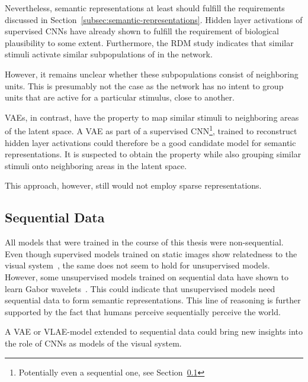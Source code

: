Nevertheless, semantic representations at least should fulfill the requirements discussed in Section~\ref{subsec:semantic-representations}.
Hidden layer activations of supervised \acp{CNN} have already shown to fulfill the requirement of biological plausibility to some extent.
Furthermore, the \ac{RDM} study indicates that similar stimuli activate similar subpopulations of  in the network.

However, it remains unclear whether these subpopulations consist of neighboring units.
This is presumably not the case as the network has no intent to group units that are active for a particular stimulus, close to another.

\acfp{VAE}, in contrast, have the property to map similar stimuli to neighboring areas of the latent space.
A \ac{VAE} as part of a supervised \ac{CNN}\footnote{Potentially even a sequential one, see Section~\ref{subsec:sequential-data}}, trained to reconstruct hidden layer activations could therefore be a good candidate model for semantic representations.
It is suspected to obtain the  property while also grouping similar stimuli onto neighboring areas in the latent space.

This approach, however, still would not employ sparse representations.

\subsection{Sequential Data}\label{subsec:sequential-data}

All models that were trained in the course of this thesis were non-sequential.
Even though supervised models trained on static images show relatedness to the visual system~\citep{khaligh2014deep,cadieu2014deep,krizhevsky2012imagenet}, the same does not seem to hold for unsupervised models.
However, some unsupervised models trained on sequential data have shown to learn Gabor wavelets~\citep{berkes2005slow,palm2012prediction}.
This could indicate that unsupervised models need sequential data to form semantic representations.
This line of reasoning is further supported by the fact that humans perceive sequentially perceive the world.

A \ac{VAE} or \ac{VLAE}-model extended to sequential data could bring new insights into the role of \acp{CNN} as models of the visual system.